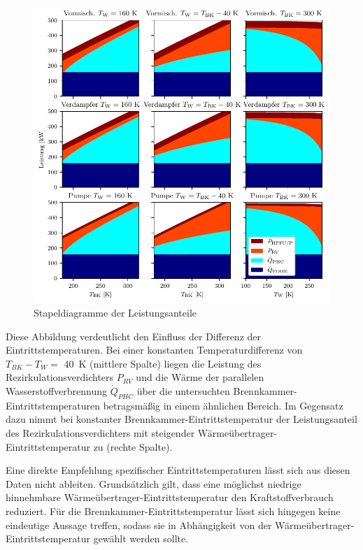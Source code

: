 \begin{figure}[ht]
\centering
\includegraphics[width=1\linewidth]{4_Abbildungen/2_Hauptteil/Ergebnisse/stackplot_summary.pdf}
  \caption{Stapeldiagramme der Leistungsanteile}
  \label{fig:stackplot}
\end{figure}
\FloatBarrier

Diese Abbildung verdeutlicht den Einfluss der Differenz der Eintrittstemperaturen. Bei einer konstanten Temperaturdifferenz von $T_{BK}-T_W=$ \SI{40}{\K} (mittlere Spalte) liegen die Leistung des Rezirkulationsverdichters $P_{RV}$ und die Wärme der parallelen Wasserstoffverbrennung $\dot{Q}_{PHC}$ über die untersuchten Brennkammer-Eintrittstemperaturen betragsmäßig in einem ähnlichen Bereich. Im Gegensatz dazu nimmt bei konstanter Brennkammer-Eintrittstemperatur der Leistungsanteil des Rezirkulationsverdichters mit steigender Wärmeübertrager-Eintrittstemperatur zu (rechte Spalte).

Eine direkte Empfehlung spezifischer Eintrittstemperaturen lässt sich aus diesen Daten nicht ableiten. Grundsätzlich gilt, dass eine möglichst niedrige hinnehmbare Wärmeübertrager-Eintrittstemperatur den Kraftstoffverbrauch reduziert. Für die Brennkammer-Eintrittstemperatur lässt sich hingegen keine eindeutige Aussage treffen, sodass sie in Abhängigkeit von der Wärmeübertrager-Eintrittstemperatur gewählt werden sollte.

